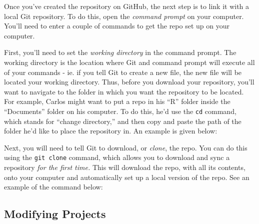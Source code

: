 \documentclass[
]{book}
\newenvironment{Shaded}{\begin{snugshade}}{\end{snugshade}}
\newcommand{\ErrorTok}[1]{\textcolor[rgb]{0.64,0.00,0.00}{\textbf{#1}}}
\newcommand{\NormalTok}[1]{#1}
\newcommand{\SpecialCharTok}[1]{\textcolor[rgb]{0.00,0.00,0.00}{#1}}
\begin{document}
Once you've created the repository on GitHub, the next step is to link it with a local Git repository. To do this, open the \emph{command prompt} on your computer. You'll need to enter a couple of commands to get the repo set up on your computer.

First, you'll need to set the \emph{working directory} in the command prompt. The working directory is the location where Git and command prompt will execute all of your commands - ie. if you tell Git to create a new file, the new file will be located your working directory. Thus, before you download your repository, you'll want to navigate to the folder in which you want the repository to be located. For example, Carlos might want to put a repo in his ``R'' folder inside the ``Documents'' folder on his computer. To do this, he'd use the \texttt{cd} command, which stands for ``change directory,'' and then copy and paste the path of the folder he'd like to place the repository in. An example is given below:

\begin{Shaded}
\end{Shaded}

Next, you will need to tell Git to download, or \emph{clone}, the repo. You can do this using the \texttt{git\ clone} command, which allows you to download and sync a repository \emph{for the first time.} This will download the repo, with all its contents, onto your computer and automatically set up a local version of the repo. See an example of the command below:

\begin{Shaded}
\end{Shaded}

\hypertarget{modifying-projects}{%
\subsection{Modifying Projects}\label{modifying-projects}}
\end{document}

